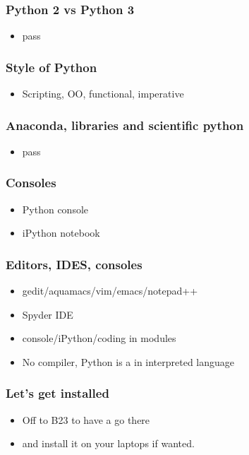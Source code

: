\documentclass{beamer}
\begin{document}
\begin{frame}
\frametitle{Python 2 vs Python 3}
\begin{itemize}
\item pass
\end{itemize}
\end{frame}

\begin{frame}
\frametitle{Style of Python}
\begin{itemize}
\item Scripting, OO, functional, imperative
\end{itemize}
\end{frame}

\begin{frame}
\frametitle{Anaconda, libraries and scientific python}
\begin{itemize}
\item pass
\end{itemize}
\end{frame}

\begin{frame}
\frametitle{Consoles}
\begin{itemize}
\item Python console 
\item iPython notebook
\end{itemize}
\end{frame}


\begin{frame}
\frametitle{Editors, IDES, consoles}
\begin{itemize}
\item gedit/aquamacs/vim/emacs/notepad++ 
\item Spyder IDE
\item console/iPython/coding in modules
\item No compiler, Python is a in interpreted language
\end{itemize}
\end{frame}

\begin{frame}
\frametitle{Let's get installed}
\begin{itemize}
\item Off to B23 to have a go there 
\item and install it on your laptops if wanted.
\end{itemize}
\end{frame}
\end{document}
